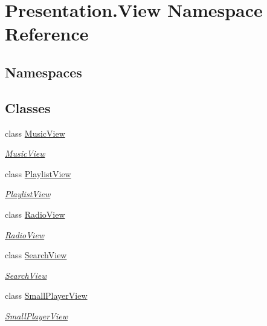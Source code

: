 \hypertarget{namespace_presentation_1_1_view}{}\section{Presentation.\+View Namespace Reference}
\label{namespace_presentation_1_1_view}
\subsection*{Namespaces}
\begin{DoxyCompactItemize}
\end{DoxyCompactItemize}
\subsection*{Classes}
\begin{DoxyCompactItemize}
\item 
class \hyperlink{class_presentation_1_1_view_1_1_music_view}{Music\+View}
\begin{DoxyCompactList}\small\item\em \hyperlink{class_presentation_1_1_view_1_1_music_view}{Music\+View} \end{DoxyCompactList}\item 
class \hyperlink{class_presentation_1_1_view_1_1_playlist_view}{Playlist\+View}
\begin{DoxyCompactList}\small\item\em \hyperlink{class_presentation_1_1_view_1_1_playlist_view}{Playlist\+View} \end{DoxyCompactList}\item 
class \hyperlink{class_presentation_1_1_view_1_1_radio_view}{Radio\+View}
\begin{DoxyCompactList}\small\item\em \hyperlink{class_presentation_1_1_view_1_1_radio_view}{Radio\+View} \end{DoxyCompactList}\item 
class \hyperlink{class_presentation_1_1_view_1_1_search_view}{Search\+View}
\begin{DoxyCompactList}\small\item\em \hyperlink{class_presentation_1_1_view_1_1_search_view}{Search\+View} \end{DoxyCompactList}\item 
class \hyperlink{class_presentation_1_1_view_1_1_small_player_view}{Small\+Player\+View}
\begin{DoxyCompactList}\small\item\em \hyperlink{class_presentation_1_1_view_1_1_small_player_view}{Small\+Player\+View} \end{DoxyCompactList}\end{DoxyCompactItemize}
